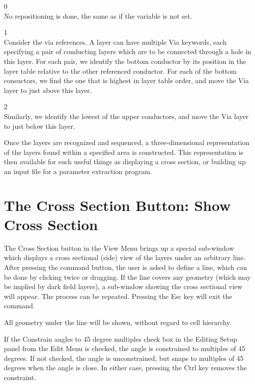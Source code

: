 \begin{description}
\item{0}\\
No repositioning is done, the same as if the variable is not set.

\item{1}\\
Consider the via references.  A layer can have multiple {\et Via}
keywords, each specifying a pair of conducting layers which are to be
connected through a hole in this layer.  For each pair, we identify
the bottom conductor by its position in the layer table relative to
the other referenced conductor.  For each of the bottom consuctors, we
find the one that is highest in layer table order, and move the {\et
Via} layer to just above this layer.

\item{2}\\
Similarly, we identify the lowest of the upper conductors, and move
the {\et Via} layer to just below this layer.
\end{description}

Once the layers are recognized and sequenced, a three-dimensional
representation of the layers found within a specified area is
constructed.  This representation is then available for such useful
things as displaying a cross section, or building up an input file for
a parameter extraction program.


\section{The {\cb Cross Section} Button: Show Cross Section}
\label{csect}
The {\cb Cross Section} button in the {\cb View Menu} brings up a
special sub-window which displays a cross sectional (side) view of the
layers under an arbitrary line.  After pressing the command button,
the user is asked to define a line, which can be done by clicking
twice or dragging.  If the line covers any geometry (which may be
implied by dark field layers), a sub-window showing the cross
sectional view will appear.  The process can be repeated.  Pressing
the {\kb Esc} key will exit the command.

All geometry under the line will be shown, without regard to cell
hierarchy.

If the {\cb Constrain angles to 45 degree multiples} check box in the
{\cb Editing Setup} panel from the {\cb Edit Menu} is checked, the
angle is constrained to multiples of 45 degrees.  If not checked, the
angle is unconstrained, but snaps to multiples of 45 degrees when the
angle is close.  In either case, pressing the {\kb Ctrl} key removes
the constraint.

